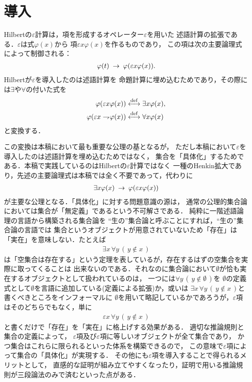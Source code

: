 \section{導入}
	Hilbertの$\varepsilon$計算は，項を形成するオペレーター$\varepsilon$を用いた
	述語計算の拡張である．$\varepsilon$は式$\varphi(x)$から
	項$\varepsilon x \varphi(x)$を作るものであり，
	この項は次の主要論理式によって制御される：
	\begin{align}
		\varphi(t) \hspace{0.25em}\rightarrow\hspace{0.25em} \varphi(\varepsilon x \varphi(x)).
	\end{align}
	Hilbertが$\varepsilon$を導入したのは述語計算を
	命題計算に埋め込むためであり，その際には$\exists$や$\forall$の付いた式を
	\begin{align}
		\varphi(\varepsilon x \varphi(x)) &\overset{\mathrm{def}}{\longleftrightarrow} \exists x \varphi(x), \\
		\varphi(\varepsilon x \rightharpoondown\hspace{-0.25em} \varphi(x)) &\overset{\mathrm{def}}{\longleftrightarrow} \forall x \varphi(x)
	\end{align}
	と変換する．
	
	この変換は本稿において最も重要な公理の基となるが，
	ただし本稿において$\varepsilon$を導入したのは述語計算を埋め込むためではなく，
	集合を「具体化」するためである．本稿で実践しているのはHilbertの$\varepsilon$計算ではなく
	一種のHenkin拡大であり，先述の主要論理式は本稿では全く不要であって，代わりに
	\begin{align}
		\exists x \varphi(x) \hspace{0.25em}\rightarrow\hspace{0.25em} \varphi(\varepsilon x \varphi(x))
	\end{align}
	が主要な公理となる．「具体化」に対する問題意識の源は，
	通常の公理的集合論においては集合が「無定義」であるという不可解さである．
	純粋に一階述語論理の言語から構築される集合論を
	``生の''集合論と呼ぶことにすれば，``生の''集合論の言語では
	集合というオブジェクトが用意されていないため「存在」は「実在」を意味しない．たとえば
	\begin{align}
		\exists x\, \forall y\, (\, y \notin x\, )
	\end{align}
	は「空集合は存在する」という定理を表しているが，存在するはずの空集合を実際に取ってくることは
	出来ないのである．それなのに集合論において$\emptyset$が恰も実在するオブジェクトとして扱われているのは，
	一つには$\forall y\, (\, y \notin \emptyset\, )$を
	$\emptyset$の定義式として$\emptyset$を言語に追加している(定義による拡張)か，或いは
	$\exists x\, \forall y\, (\, y \notin x\, )$と書くべきところをインフォーマルに
	$\emptyset$を用いて略記しているかであろうが，$\varepsilon$項はそのどちらでもなく，単に
	\begin{align}
		\varepsilon x\, \forall y\, (\, y \notin x\, )
	\end{align}
	と書くだけで「存在」を「実在」に格上げする効果がある．
	適切な推論規則と集合の定義によって，
	$\varepsilon$項及び$\varepsilon$項に等しいオブジェクトが全て集合であり，
	かつ集合はこれらに限られるといった体系を構築できるので，
	この意味で$\varepsilon$項によって集合の「具体化」が実現する．
	その他にも$\varepsilon$項を導入することで得られるメリットとして，
	直感的な証明が組み立てやすくなったり，証明で用いる推論規則が三段論法のみで済むといった点がある．
	
